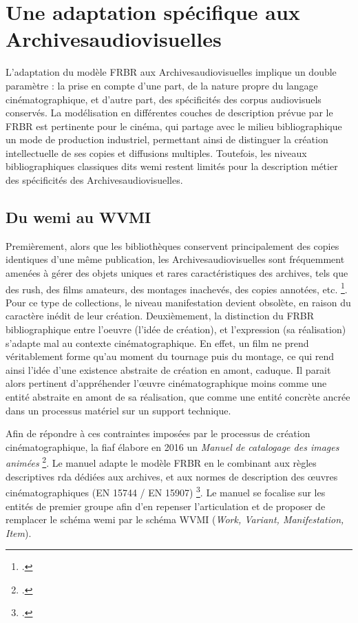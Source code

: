 \section{\label{I_1_C} Une adaptation spécifique aux \gls{Archivesaudiovisuelles}} 

L’adaptation du modèle \gls{FRBR} aux \gls{Archivesaudiovisuelles} implique un double paramètre : la prise en compte d’une part, de la nature propre du langage cinématographique, et d’autre part, des spécificités des corpus audiovisuels conservés. La modélisation en différentes couches de description prévue par le \gls{FRBR} est pertinente pour le cinéma, qui partage avec le milieu bibliographique un mode de production industriel, permettant ainsi de distinguer la création intellectuelle de ses copies et diffusions multiples. Toutefois, les niveaux bibliographiques classiques dits \gls{wemi} restent limités pour la description métier des spécificités des \gls{Archivesaudiovisuelles}.

\subsection{Du \gls{wemi} au \gls{WVMI}}

Premièrement, alors que les bibliothèques conservent principalement des copies identiques d’une même publication, les \gls{Archivesaudiovisuelles} sont fréquemment amenées à gérer des objets uniques et rares caractéristiques des archives, tels que des \gls{rush}, des films amateurs, des montages inachevés, des copies annotées, etc. \footcite{zotero-item-646}. Pour ce type de collections, le niveau \gls{manifestation} devient obsolète, en raison du caractère inédit de leur création. Deuxièmement, la distinction du \gls{FRBR} bibliographique entre l’\gls{oeuvre} (l’idée de création), et l’\gls{expression} (sa réalisation) s’adapte mal au contexte cinématographique. En effet, un film ne prend véritablement forme qu'au moment du tournage puis du montage, ce qui rend ainsi l’idée d’une existence abstraite de création en amont, caduque. Il parait alors pertinent d’appréhender l’œuvre cinématographique moins comme une entité abstraite en amont de sa réalisation, que comme une entité concrète ancrée dans un processus matériel sur un support technique.  

Afin de répondre à ces contraintes imposées par le processus de création cinématographique, la \gls{fiaf} élabore en 2016 un \textit{Manuel de catalogage des images animées} \footcite{zotero-item-646}. Le manuel adapte le modèle \gls{FRBR} en le combinant aux règles descriptives \gls{rda} dédiées aux archives, et aux normes de description des œuvres cinématographiques (EN 15744 / EN 15907) \footcite{zotero-item-646}. Le manuel se focalise sur les entités de premier groupe afin d’en repenser l’articulation et de proposer de remplacer le schéma \gls{wemi} par le schéma \gls{WVMI} (\textit{Work, Variant, Manifestation, Item}).  

